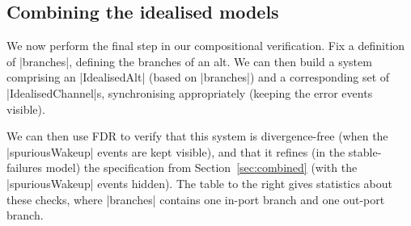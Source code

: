 \subsection{Combining the idealised models}
\label{sec:combiningIdealised}

We now perform the final step in our compositional verification. 
%
Fix a definition of |branches|, defining the branches of an
alt.  We can then build a system comprising an |IdealisedAlt| (based on
|branches|) and a corresponding set of |IdealisedChannel|s, synchronising
appropriately (keeping the error events visible).

\begin{window}
%
We can then use FDR to verify that this system is divergence-free (when the
|spuriousWakeup| events are kept visible), and that it refines (in the
stable-failures model) the specification from Section~\ref{sec:combined} (with
the |spuriousWakeup| events hidden).  The table to the right gives statistics
about these checks, where 
|branches| contains one in-port branch and one out-port branch.
\end{window}



